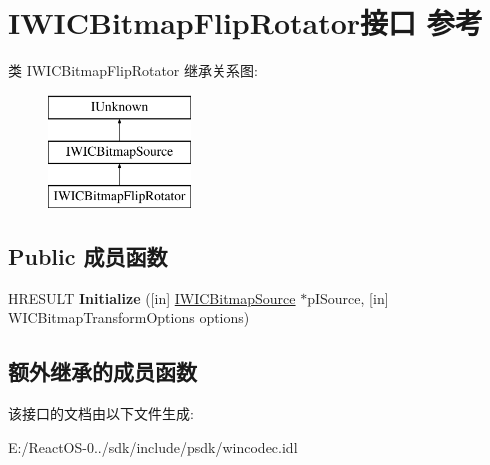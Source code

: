 \hypertarget{interface_i_w_i_c_bitmap_flip_rotator}{}\section{I\+W\+I\+C\+Bitmap\+Flip\+Rotator接口 参考}
\label{interface_i_w_i_c_bitmap_flip_rotator}
类 I\+W\+I\+C\+Bitmap\+Flip\+Rotator 继承关系图\+:\begin{figure}[H]
\begin{center}
\leavevmode
\includegraphics[height=3.000000cm]{interface_i_w_i_c_bitmap_flip_rotator}
\end{center}
\end{figure}
\subsection*{Public 成员函数}
\begin{DoxyCompactItemize}
\item 
\mbox{\label{interface_i_w_i_c_bitmap_flip_rotator_a6ad9b599e9c9b9ad47cb6183811aeb0e}} 
H\+R\+E\+S\+U\+LT {\bfseries Initialize} (\mbox{[}in\mbox{]} \hyperlink{interface_i_w_i_c_bitmap_source}{I\+W\+I\+C\+Bitmap\+Source} $\ast$p\+I\+Source, \mbox{[}in\mbox{]} W\+I\+C\+Bitmap\+Transform\+Options options)
\end{DoxyCompactItemize}
\subsection*{额外继承的成员函数}


该接口的文档由以下文件生成\+:\begin{DoxyCompactItemize}
\item 
E\+:/\+React\+O\+S-\/0../sdk/include/psdk/wincodec.\+idl\end{DoxyCompactItemize}
